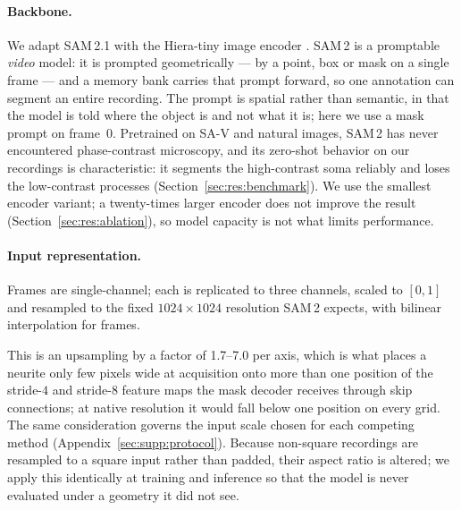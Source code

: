 \documentclass[11pt,a4paper]{article}
\begin{document}
\paragraph{Backbone.}
We adapt SAM\,2.1 with the Hiera-tiny image encoder
\cite{ravi2025sam2,ryali2023hiera}. SAM\,2 is a promptable \emph{video}
model: it is prompted geometrically --- by a point, box or mask on a single
frame --- and a memory bank carries that prompt forward, so one annotation
can segment an entire recording. The prompt is spatial rather than semantic,
in that the model is told where the object is and not what it is; here we
use a mask prompt on frame~0. Pretrained on SA-V and natural images, SAM\,2
has never encountered phase-contrast microscopy, and its zero-shot behavior
on our recordings is characteristic: it segments the high-contrast soma
reliably and loses the low-contrast processes
(Section~\ref{sec:res:benchmark}). We use the smallest encoder variant; a
twenty-times larger encoder does not improve the result
(Section~\ref{sec:res:ablation}), so model capacity is not what limits
performance.

\paragraph{Input representation.}
Frames are single-channel; each is replicated to three channels, scaled to
$[0,1]$ and resampled to the fixed $1024\times1024$ resolution SAM\,2
expects, with bilinear interpolation for frames.

This is an upsampling by a factor of 1.7--7.0 per axis, which is what places a
neurite only few pixels wide at acquisition onto more than one position of the
stride-$4$ and stride-$8$ feature maps the mask decoder receives through skip
connections; at native resolution it would fall below one position on every
grid. The same consideration governs the input scale chosen for each competing
method (Appendix~\ref{sec:supp:protocol}). Because non-square recordings are
resampled to a square input rather than padded, their aspect ratio is altered;
we apply this identically at training and inference so that the model is never
evaluated under a geometry it did not see.
\end{document}
